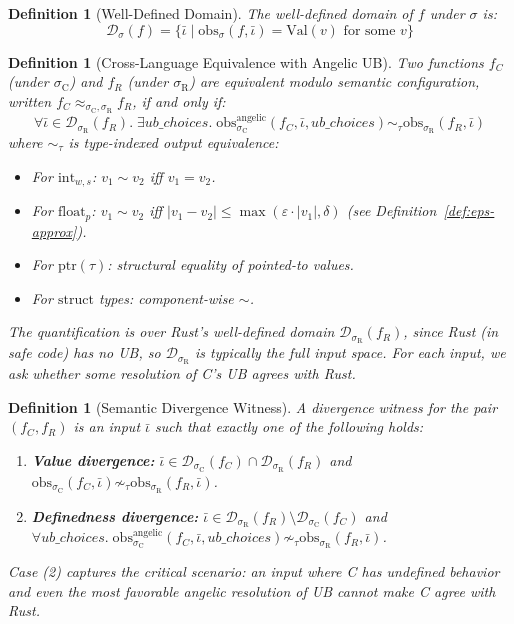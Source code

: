 \documentclass[11pt]{article}
\newtheorem{definition}[theorem]{Definition}
\newcommand{\SemConfig}{\sigma}
\newcommand{\SemConfigC}{\sigma_{\mathrm{C}}}
\newcommand{\SemConfigR}{\sigma_{\mathrm{R}}}
\newcommand{\obs}{\mathrm{obs}}
\begin{document}
\begin{definition}[Well-Defined Domain]
\label{def:welldefined}
The well-defined domain of $f$ under $\SemConfig$ is:
\[
\mathcal{D}_\SemConfig(f) = \{ \bar{\iota} \mid \obs_\SemConfig(f, \bar{\iota}) = \mathrm{Val}(v) \text{ for some } v \}
\]
\end{definition}

\begin{definition}[Cross-Language Equivalence with Angelic UB]
\label{def:xlangeq}
Two functions $f_C$ (under $\SemConfigC$) and $f_R$ (under $\SemConfigR$) are \emph{equivalent modulo semantic configuration}, written $f_C \approx_{\SemConfigC, \SemConfigR} f_R$, if and only if:
\[
\forall \bar{\iota} \in \mathcal{D}_{\SemConfigR}(f_R).\; \exists \mathit{ub\_choices}.\; \obs^{\mathrm{angelic}}_{\SemConfigC}(f_C, \bar{\iota}, \mathit{ub\_choices}) \sim_\tau \obs_{\SemConfigR}(f_R, \bar{\iota})
\]
where $\sim_\tau$ is \emph{type-indexed output equivalence}:
\begin{itemize}
  \item For $\mathrm{int}_{w,s}$: $v_1 \sim v_2$ iff $v_1 = v_2$.
  \item For $\mathrm{float}_p$: $v_1 \sim v_2$ iff $|v_1 - v_2| \leq \max(\varepsilon \cdot |v_1|, \delta)$ (see Definition~\ref{def:eps-approx}).
  \item For $\mathrm{ptr}(\tau)$: structural equality of pointed-to values.
  \item For $\mathrm{struct}$ types: component-wise $\sim$.
\end{itemize}
The quantification is over Rust's well-defined domain $\mathcal{D}_{\SemConfigR}(f_R)$, since Rust (in safe code) has no UB, so $\mathcal{D}_{\SemConfigR}$ is typically the full input space. For each input, we ask whether \emph{some} resolution of C's UB agrees with Rust.
\end{definition}

\begin{definition}[Semantic Divergence Witness]
\label{def:witness}
A \emph{divergence witness} for the pair $(f_C, f_R)$ is an input $\bar{\iota}$ such that exactly one of the following holds:
\begin{enumerate}
  \item \textbf{Value divergence:} $\bar{\iota} \in \mathcal{D}_{\SemConfigC}(f_C) \cap \mathcal{D}_{\SemConfigR}(f_R)$ and $\obs_{\SemConfigC}(f_C, \bar{\iota}) \not\sim_\tau \obs_{\SemConfigR}(f_R, \bar{\iota})$.
  \item \textbf{Definedness divergence:} $\bar{\iota} \in \mathcal{D}_{\SemConfigR}(f_R) \setminus \mathcal{D}_{\SemConfigC}(f_C)$ and $\forall \mathit{ub\_choices}.\; \obs^{\mathrm{angelic}}_{\SemConfigC}(f_C, \bar{\iota}, \mathit{ub\_choices}) \not\sim_\tau \obs_{\SemConfigR}(f_R, \bar{\iota})$.
\end{enumerate}
Case (2) captures the critical scenario: an input where C has undefined behavior and even the most favorable angelic resolution of UB cannot make C agree with Rust.
\end{definition}
\end{document}
